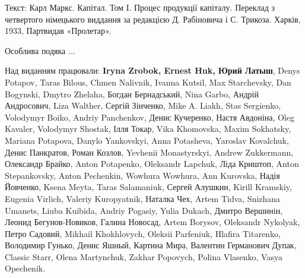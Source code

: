 
Текст: Карл Маркс. Капітал. Том І. Процес продукції капіталу. Переклад з четвертого німецького виддання за редакцією Д. Рабіновича і С. Трикоза. Харків, 1933, Партвидав «Пролетар».

\smallskip\noindent Особлива подяка ... 

\smallskip\noindent Над виданням працювали:
\textbf{Iryna Zrobok, Ernest Huk, Юрий Латыш},
Denys Po\-ta\-pov, Taras Bilous, Chmen Nalivnik, Ivanna Kutsil, Max Starchevsky, Dan Bogynski, Dmytro Zhelaha, Богдан Бернадський, Nina Garbo, Андрій Андросович, Liza Walther, Сергій Зінченко,
{\small
Mike A. Liakh, Stas Sergienko, Volodymyr Boiko, Andriy Panchenkov, Денис Кучеренко, Настя Авдоніна, Oleg Kavaler, Volodymyr Shostak, Ілля Токар, Vika Khomovska, Maxim Sokhatsky, Mariana Potapova, Danylo Yankovskyi, Anna Potasheva, Yaroslav Kovalchuk, Денис Панкратов, Роман Козлов, \textenglish{Yevhenii Mo\-nas\-tyr\-skyi}, Andrew Zukkermann, Олександр Брайко, Anton Potapenko, Oleksandr Lapchuk, Ліда Криштоп, Anton Stepankovsky, Anton Pechenkin, Wowhura Wowhura, Ann Kurovska, Надія Йовченко, Ksena Meyta, Taras Salamaniuk, Сергей Алушкин, Kirill Kramskiy, Eugenia Virlich, Valeriy Kuropyatnik, Наталка Чех, Artem Tidva, Snizhana Umanets, Liuba Kuibida, Andriy Pogasiy, Yulia Dukach, Дмитро Вершинін, Леонид Бегунов-Новиков, Галина Новосад, Artem Borysov, Oleksandr Nykolyak, Петро Садовий, Mikhail Khokhlovych, Oleksii Parfeniuk, Hlafira Titarenko, Володимир Гунько, Денис Яшный, Картина Мира, Валентин Германович Дупак, Classic Starr, Olena Martynchuk, Zakhar Popovych, Polina Vlasenko, Vasya Opechenik.}

\cleardoublepage